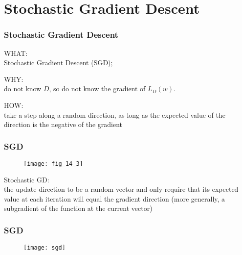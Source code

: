 \section{Stochastic Gradient Descent}

\begin{frame}
\frametitle{Stochastic Gradient Descent}

WHAT:\\
Stochastic Gradient Descent (SGD);
\vspace{5mm}

WHY:\\
do not know $D$, so do not know the gradient of $L_D(w)$.
\vspace{5mm}

HOW:\\
take a step along a random direction, as long as
the expected value of the direction is the negative of the gradient

\end{frame}

\begin{frame}
\frametitle{SGD}

\begin{figure}
    \centering
    \texttt{[image: fig\_14\_3]}
\end{figure}

Stochastic GD:\\
the update direction to be a random vector and
only require that its expected value at each iteration will equal the gradient direction
(more generally, a subgradient of the function at the current vector)

\end{frame}

\begin{frame}
\frametitle{SGD}

\begin{figure}
    \centering
    \texttt{[image: sgd]}
\end{figure}

\end{frame}
